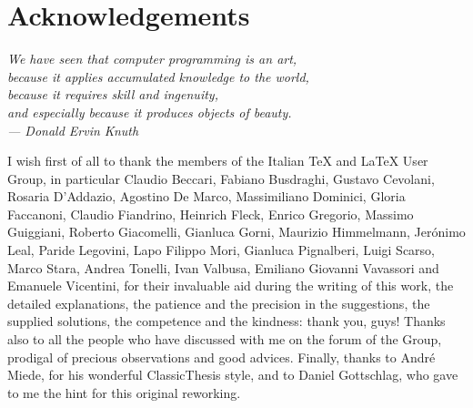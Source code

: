 

\chapter*{Acknowledgements}

\begin{flushright}
\itshape
We have seen that computer programming is an art, \\
because it applies accumulated knowledge to the world, \\
because it requires skill and ingenuity, \\
and especially because it produces objects of beauty. \\
\medskip
--- Donald Ervin Knuth
\end{flushright}

\bigskip
\bigskip

I wish first of all to thank the members of the Italian \TeX{} and \LaTeX{} User Group, in particular
Claudio Beccari, Fabiano Busdraghi, Gustavo Cevolani, Rosaria D'Addazio, Agostino De Marco, Massimiliano Dominici, Gloria Faccanoni, Claudio Fiandrino, Heinrich Fleck, Enrico Gregorio, Massimo Guiggiani, Roberto Giacomelli, Gianluca Gorni, Maurizio Himmelmann, Jer\'onimo Leal, Paride Legovini, Lapo Filippo Mori, Gianluca Pignalberi, Luigi Scarso, Marco Stara, Andrea Tonelli, Ivan Valbusa, Emiliano Giovanni Vavassori and Emanuele Vicentini,
for their invaluable aid during the writing of this work, the detailed explanations, the patience and the precision in the suggestions, the supplied solutions, the competence and the kindness: thank you, guys!
Thanks also to all the people who have discussed with me on the forum of the Group, prodigal of precious observations and good advices.
Finally, thanks to Andr\'e Miede, for his wonderful ClassicThesis style, and to Daniel Gottschlag, who gave to me the hint for this original reworking.